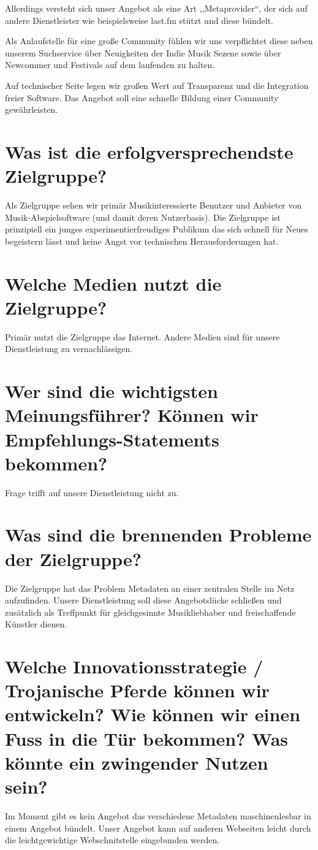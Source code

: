 \documentclass[11pt]{scrreprt}
\begin{document}
Allerdings versteht sich unser Angebot als eine Art ,,Metaprovider``, der sich
auf andere Dienstleister wie beispielsweise last.fm stützt und diese bündelt.

Als Anlaufstelle für eine große Community fühlen wir uns verpflichtet diese
neben unserem Suchservice über Neuigkeiten der Indie Musik Sezene sowie über
Newcommer und Festivals auf dem laufenden zu halten. 

Auf technischer Seite legen wir großen Wert auf Transparenz und die Integration
freier Software. Das Angebot soll eine schnelle Bildung einer Community
gewährleisten.


\section{Was ist die erfolgversprechendste Zielgruppe?}
Als Zielgruppe sehen wir primär Musikinteressierte Benutzer und Anbieter von
Musik-Abspielsoftware (und damit deren Nutzerbasis).
Die Zielgruppe ist prinzipiell ein junges experimentierfreudiges Publikum das
sich schnell für Neues begeistern lässt und keine Angst vor technischen Herausforderungen hat.


\section{Welche Medien nutzt die Zielgruppe?}
Primär nutzt die Zielgruppe das Internet. Andere Medien sind für unsere
Dienstleistung zu vernachlässigen.


\section{Wer sind die wichtigsten Meinungsführer?
Können wir Empfehlungs-Statements bekommen?}
Frage trifft auf unsere Dienstleistung nicht zu.


\section{Was sind die brennenden Probleme der
Zielgruppe?}
Die Zielgruppe hat das Problem Metadaten an einer zentralen Stelle im Netz
aufzufinden. Unsere Dienstleistung soll diese Angebotslücke schließen und
zusätzlich als Treffpunkt für gleichgesinnte Musikliebhaber und freischaffende
Künstler dienen.


\section{Welche Innovationsstrategie / Trojanische Pferde können wir entwickeln?
    Wie können wir einen Fuss in die Tür bekommen?
Was könnte ein zwingender Nutzen sein?}
Im Moment gibt es kein Angebot das verschiedene Metadaten maschinenlesbar 
in einem Angebot bündelt. Unser Angebot kann auf anderen Webseiten leicht durch
die leichtgewichtige Webschnitstelle eingebunden werden.
\end{document}

